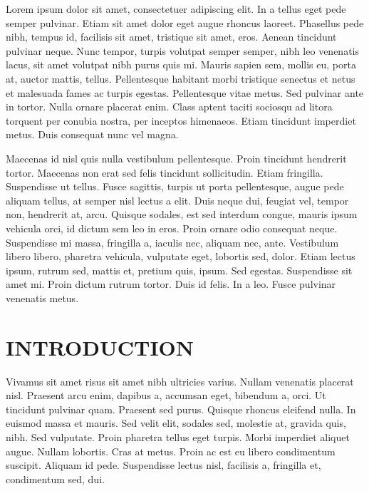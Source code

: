 \documentclass[12pt]{article}
\begin{document}
\dotableofcontents

Lorem ipsum dolor sit amet, consectetuer adipiscing elit. In a tellus eget pede semper pulvinar. Etiam sit amet dolor eget augue rhoncus laoreet. Phasellus pede nibh, tempus id, facilisis sit amet, tristique sit amet, eros. Aenean tincidunt pulvinar neque. Nunc tempor, turpis volutpat semper semper, nibh leo venenatis lacus, sit amet volutpat nibh purus quis mi. Mauris sapien sem, mollis eu, porta at, auctor mattis, tellus. Pellentesque habitant morbi tristique senectus et netus et malesuada fames ac turpis egestas. Pellentesque vitae metus. Sed pulvinar ante in tortor. Nulla ornare placerat enim. Class aptent taciti sociosqu ad litora torquent per conubia nostra, per inceptos himenaeos. Etiam tincidunt imperdiet metus. Duis consequat nunc vel magna.

Maecenas id nisl quis nulla vestibulum pellentesque. Proin tincidunt hendrerit tortor. Maecenas non erat sed felis tincidunt sollicitudin. Etiam fringilla. Suspendisse ut tellus. Fusce sagittis, turpis ut porta pellentesque, augue pede aliquam tellus, at semper nisl lectus a elit. Duis neque dui, feugiat vel, tempor non, hendrerit at, arcu. Quisque sodales, est sed interdum congue, mauris ipsum vehicula orci, id dictum sem leo in eros. Proin ornare odio consequat neque. Suspendisse mi massa, fringilla a, iaculis nec, aliquam nec, ante. Vestibulum libero libero, pharetra vehicula, vulputate eget, lobortis sed, dolor. Etiam lectus ipsum, rutrum sed, mattis et, pretium quis, ipsum. Sed egestas. Suspendisse sit amet mi. Proin dictum rutrum tortor. Duis id felis. In a leo. Fusce pulvinar venenatis metus.

\newpage

\section{INTRODUCTION}
Vivamus sit amet risus sit amet nibh ultricies varius. Nullam venenatis placerat nisl. Praesent arcu enim, dapibus a, accumsan eget, bibendum a, orci. Ut tincidunt pulvinar quam. Praesent sed purus. Quisque rhoncus eleifend nulla. In euismod massa et mauris. Sed velit elit, sodales sed, molestie at, gravida quis, nibh. Sed vulputate. Proin pharetra tellus eget turpis. Morbi imperdiet aliquet augue. Nullam lobortis. Cras at metus. Proin ac est eu libero condimentum suscipit. Aliquam id pede. Suspendisse lectus nisl, facilisis a, fringilla et, condimentum sed, dui. \cite{test1}
\end{document}
